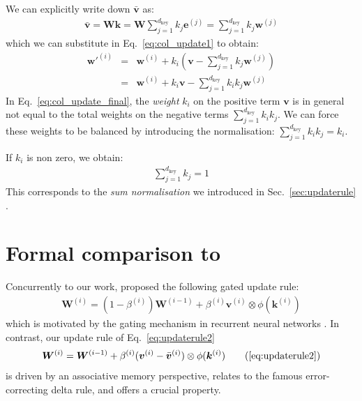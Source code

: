 \documentclass{article}
\def\ve{{\bm{e}}}
\def\vk{{\bm{k}}}
\def\vv{{\bm{v}}}
\def\vw{{\bm{w}}}
\def\mW{{\bm{W}}}
\theoremstyle{definition}
\begin{document}
We can explicitly write down $\bar{\vv}$ as:
\begin{eqnarray}
\bar{\vv} = \mW \vk = \mW \sum_{j=1}^{d_\text{key}} k_j \ve^{(j)} = \sum_{j=1}^{d_\text{key}} k_j \vw^{(j)}
\end{eqnarray}
which we can substitute in Eq.~\ref{eq:col_update1} to obtain:
\begin{eqnarray}
\vw'^{(i)} &=& \vw^{(i)} +  k_i (\vv - \sum_{j=1}^{d_\text{key}} k_j \vw^{(j)} ) \\
&=& \vw^{(i)} +  k_i \vv - \sum_{j=1}^{d_\text{key}} k_i k_j \vw^{(j)} \label{eq:col_update_final}
\end{eqnarray}
In Eq.~\ref{eq:col_update_final}, the \textit{weight} $k_i$ on the positive term $\vv$ is in general
not equal to the total weights on the negative terms $\sum_{j=1}^{d_\text{key}} k_i k_j$.
We can force these weights to be balanced by introducing the normalisation: $ \displaystyle \sum_{j=1}^{d_\text{key}} k_i k_j = k_i$.

If $k_i$ is non zero, we obtain: 
\begin{eqnarray*}
\sum_{j=1}^{d_\text{key}} k_j  = 1
\end{eqnarray*}
This corresponds to the \textit{sum normalisation} we introduced in Sec.~\ref{sec:updaterule} \qedsymbol.

\section{Formal comparison to \citet{peng2021random}}
\label{sec:peng}
Concurrently to our work, \citet{peng2021random} proposed the following gated update rule:
\begin{align}
\mW^{(i)}= (1-\beta^{(i)}) \mW^{(i-1)} + \beta^{(i)} \vv^{(i)} \otimes \phi(\vk^{(i)})
\end{align}
which is motivated by the gating mechanism in recurrent neural networks \citep{hochreiter1997long}.
In contrast, our update rule of Eq.~\ref{eq:updaterule2} 
\begin{align}
\mW^{(i)}= \mW^{(i-1)} + \beta^{(i)}(\vv^{(i)} - \bar{\vv}^{(i)}) \otimes \phi(\vk^{(i)})  \tag{\ref{eq:updaterule2}}
\end{align}
is driven by an associative memory
perspective, relates to the famous error-correcting delta rule,
and offers a crucial property.
\end{document}

